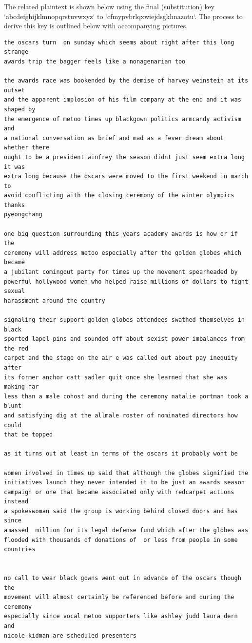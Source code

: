 \documentclass[12pt]{article}
\begin{document}
The related plaintext is shown below using the final (substitution) key `abcdefghijklmnopqrstuvwxyz` to `cfmypvbrlqxwiejdsgkhnazotu`. The process to derive this key is outlined below with accompanying pictures.


\begin{verbatim}
the oscars turn  on sunday which seems about right after this long strange
awards trip the bagger feels like a nonagenarian too

the awards race was bookended by the demise of harvey weinstein at its outset
and the apparent implosion of his film company at the end and it was shaped by
the emergence of metoo times up blackgown politics armcandy activism and
a national conversation as brief and mad as a fever dream about whether there
ought to be a president winfrey the season didnt just seem extra long it was
extra long because the oscars were moved to the first weekend in march to
avoid conflicting with the closing ceremony of the winter olympics thanks
pyeongchang

one big question surrounding this years academy awards is how or if the
ceremony will address metoo especially after the golden globes which became
a jubilant comingout party for times up the movement spearheaded by 
powerful hollywood women who helped raise millions of dollars to fight sexual
harassment around the country

signaling their support golden globes attendees swathed themselves in black
sported lapel pins and sounded off about sexist power imbalances from the red
carpet and the stage on the air e was called out about pay inequity after
its former anchor catt sadler quit once she learned that she was making far
less than a male cohost and during the ceremony natalie portman took a blunt
and satisfying dig at the allmale roster of nominated directors how could
that be topped

as it turns out at least in terms of the oscars it probably wont be

women involved in times up said that although the globes signified the
initiatives launch they never intended it to be just an awards season
campaign or one that became associated only with redcarpet actions instead
a spokeswoman said the group is working behind closed doors and has since
amassed  million for its legal defense fund which after the globes was
flooded with thousands of donations of  or less from people in some 
countries


no call to wear black gowns went out in advance of the oscars though the
movement will almost certainly be referenced before and during the ceremony 
especially since vocal metoo supporters like ashley judd laura dern and
nicole kidman are scheduled presenters


\end{verbatim}
\end{document}

